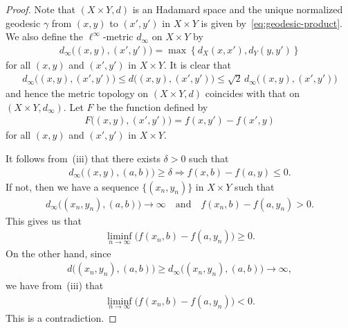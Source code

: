 \documentclass[draft]{amsart}
\numberwithin{equation}{section}
\theoremstyle{plain}
\theoremstyle{definition}
\theoremstyle{remark}
\begin{document}
\begin{proof}
 Note that $(X\times Y, d)$ is an Hadamard space 
 and the unique normalized geodesic $\gamma$ from $(x,y)$ to $(x',y')$ 
 in $X\times Y$ 
 is given by~\eqref{eq:geodesic-product}. 
 We also define the $\ell^{\infty}$-metric $d_{\infty}$ on $X\times Y$ by 
 \begin{align}
  d_{\infty}\bigl((x,y), (x',y')\bigr)
 =\max\left\{
  d_X(x,x'), d_Y(y,y')
  \right\}
 \end{align}
 for all $(x,y)$ and $(x',y')$ in $X\times Y$. 
 It is clear that 
 \begin{align}
  d_{\infty}\bigl((x,y), (x',y')\bigr)
  \leq d\bigl((x,y), (x',y')\bigr)
  \leq \sqrt{2} \, d_{\infty}\bigl((x,y), (x',y')\bigr)
 \end{align}
 and hence the metric topology on $(X\times Y,d)$ coincides with 
 that on $(X\times Y,d_{\infty})$. 
 Let $F$ be the function defined by 
 \begin{align}%
  F\bigl((x,y), (x',y')\bigr) = f(x, y') - f(x', y)
 \end{align}
 for all $(x,y)$ and $(x',y')$ in $X\times Y$. 

 It follows from~(iii) that there exists $\delta>0$ such that 
 \begin{align}
  d_{\infty}\bigl((x,y), (a,b)\bigr) \geq \delta 
 \Rightarrow 
 f(x, b) - f(a, y) \leq 0. 
 \end{align}
 If not, then 
 we have a sequence $\{(x_n,y_n)\}$ in $X\times Y$ such that 
 \begin{align}
  d_{\infty}\bigl((x_n,y_n),(a,b)\bigr)\to \infty 
  \quad \textrm{and} \quad 
  f(x_n, b) - f(a, y_n) > 0. 
 \end{align}
 This gives us that 
 \begin{align}
  \liminf_{n\to \infty}\bigl(f(x_n, b) - f(a, y_n)\bigr)\geq 0. 
 \end{align}
 On the other hand, since 
 \begin{align}
  d\bigl((x_n,y_n),(a,b)\bigr)
  \geq d_{\infty}\bigl((x_n,y_n),(a,b)\bigr)
  \to \infty, 
 \end{align}
 we have from~(iii) that 
 \begin{align}
  \liminf_{n\to \infty}\bigl(f(x_n, b) - f(a, y_n)\bigr) <0. 
 \end{align}
 This is a contradiction. 


\end{proof}
\end{document}
